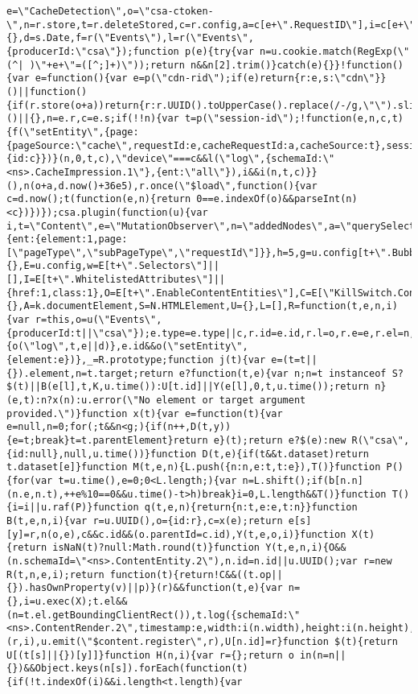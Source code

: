 \documentclass[
]{article}
\begin{document}
\begin{verbatim}
e=\"CacheDetection\",o=\"csa-ctoken-\",n=r.store,t=r.deleteStored,c=r.config,a=c[e+\".RequestID\"],i=c[e+\".Callback\"],s=r.global,u=s.document||{},d=s.Date,f=r(\"Events\"),l=r(\"Events\",{producerId:\"csa\"});function p(e){try{var n=u.cookie.match(RegExp(\"(^| )\"+e+\"=([^;]+)\"));return n&&n[2].trim()}catch(e){}}!function(){var e=function(){var e=p(\"cdn-rid\");if(e)return{r:e,s:\"cdn\"}}()||function(){if(r.store(o+a))return{r:r.UUID().toUpperCase().replace(/-/g,\"\").slice(0,20),s:\"device\"}}()||{},n=e.r,c=e.s;if(!!n){var t=p(\"session-id\");!function(e,n,c,t){f(\"setEntity\",{page:{pageSource:\"cache\",requestId:e,cacheRequestId:a,cacheSource:t},session:{id:c}})}(n,0,t,c),\"device\"===c&&l(\"log\",{schemaId:\"<ns>.CacheImpression.1\"},{ent:\"all\"}),i&&i(n,t,c)}}(),n(o+a,d.now()+36e5),r.once(\"$load\",function(){var c=d.now();t(function(e,n){return 0==e.indexOf(o)&&parseInt(n)<c})})});csa.plugin(function(u){var i,t=\"Content\",e=\"MutationObserver\",n=\"addedNodes\",a=\"querySelectorAll\",f=\"matches\",o=\"getAttributeNames\",r=\"getAttribute\",s=\"dataset\",c=\"widget\",l=\"producerId\",d={ent:{element:1,page:[\"pageType\",\"subPageType\",\"requestId\"]}},h=5,g=u.config[t+\".BubbleUp.SearchDepth\"]||20,p=u.config[t+\".SearchPage\"]||0,m=\"csaC\",y=m+\"Id\",v=\"logRender\",b={},E=u.config,w=E[t+\".Selectors\"]||[],I=E[t+\".WhitelistedAttributes\"]||{href:1,class:1},O=E[t+\".EnableContentEntities\"],C=E[\"KillSwitch.ContentRendered\"],N=u.global,k=N.document||{},A=k.documentElement,S=N.HTMLElement,U={},L=[],R=function(t,e,n,i){var r=this,o=u(\"Events\",{producerId:t||\"csa\"});e.type=e.type||c,r.id=e.id,r.l=o,r.e=e,r.el=n,r.rt=i,r.dlo=d,r.op=H(n,\"csaOp\"),r.log=function(t,e){o(\"log\",t,e||d)},e.id&&o(\"setEntity\",{element:e})},_=R.prototype;function j(t){var e=(t=t||{}).element,n=t.target;return e?function(t,e){var n;n=t instanceof S?$(t)||B(e[l],t,K,u.time()):U[t.id]||Y(e[l],0,t,u.time());return n}(e,t):n?x(n):u.error(\"No element or target argument provided.\")}function x(t){var e=function(t){var e=null,n=0;for(;t&&n<g;){if(n++,D(t,y)){e=t;break}t=t.parentElement}return e}(t);return e?$(e):new R(\"csa\",{id:null},null,u.time())}function D(t,e){if(t&&t.dataset)return t.dataset[e]}function M(t,e,n){L.push({n:n,e:t,t:e}),T()}function P(){for(var t=u.time(),e=0;0<L.length;){var n=L.shift();if(b[n.n](n.e,n.t),++e%10==0&&u.time()-t>h)break}i=0,L.length&&T()}function T(){i=i||u.raf(P)}function q(t,e,n){return{n:t,e:e,t:n}}function B(t,e,n,i){var r=u.UUID(),o={id:r},c=x(e);return e[s][y]=r,n(o,e),c&&c.id&&(o.parentId=c.id),Y(t,e,o,i)}function X(t){return isNaN(t)?null:Math.round(t)}function Y(t,e,n,i){O&&(n.schemaId=\"<ns>.ContentEntity.2\"),n.id=n.id||u.UUID();var r=new R(t,n,e,i);return function(t){return!C&&((t.op||{}).hasOwnProperty(v)||p)}(r)&&function(t,e){var n={},i=u.exec(X);t.el&&(n=t.el.getBoundingClientRect()),t.log({schemaId:\"<ns>.ContentRender.2\",timestamp:e,width:i(n.width),height:i(n.height),positionX:i(n.left+N.pageXOffset),positionY:i(n.top+N.pageYOffset)})}(r,i),u.emit(\"$content.register\",r),U[n.id]=r}function $(t){return U[(t[s]||{})[y]]}function H(n,i){var r={};return o in(n=n||{})&&Object.keys(n[s]).forEach(function(t){if(!t.indexOf(i)&&i.length<t.length){var 
\end{verbatim}
\end{document}
